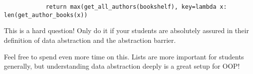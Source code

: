     \begin{solution}[1in]
        \begin{lstlisting}
            return max(get_all_authors(bookshelf), key=lambda x: len(get_author_books(x))
        \end{lstlisting}
    \end{solution}

    \begin{questionmeta}
        This is a hard question! Only do it if your students are absolutely assured in their definition of data abstraction and the abstraction barrier.

        Feel free to spend even more time on this. Lists are more important for students generally, but understanding data abstraction deeply is a great setup for OOP!
    \end{questionmeta}
